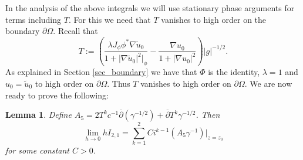 \documentclass[a4paper, 10pt, twoside, notitlepage]{amsart}
\theoremstyle{plain}
\newtheorem{lem}[prop]{Lemma}
\newcommand{\Om}{\Omega}
\numberwithin{equation}{section}
\newcommand {\p} {\partial}
\newcommand{\dbar}{\ol{\p}}
\newcommand{\ol}[1]{\overline{#1}}
\newcommand{\abs}[1]{\lvert #1 \rvert}
\begin{document}
In the analysis of the above integrals we will use stationary phase arguments for terms including $T$. For this we need that $T$ vanishes to high order on the boundary $\p\Om$. Recall that 
\begin{equation*}
	T:=\left(\frac{\lambda J_{\phi} \phi^*\nabla \tilde u_0}{1+\abs{\nabla \tilde u_0}^2|_{\phi}} - \frac{\nabla u_0}{1+\abs{\nabla u_0}^2}\right)\abs{g}^{-1/2}.
\end{equation*}
As explained in Section \ref{sec_boundary} we have that $\Phi$ is the identity, $\lambda=1$ and $u_0=\tilde u_0$ to high order on $\p\Om$. Thus $T$ vanishes to high order on $\p\Om$. We are now ready to prove the following:

\begin{lem}\label{lemma_A}
	Define $A_5=2T^kc^{-1}\dbar(\gamma^{-1/2}) + \dbar T^k\gamma^{-1/2}$. Then
	$$\lim_{h\to 0} hI_{2,1} = \sum_{k=1}^2Ci^{k-1}(A_5\gamma^{-1})|_{z=z_0}$$
	for some constant $C>0$.
\end{lem}
\end{document}

